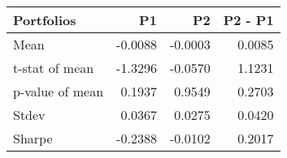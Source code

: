 \begin{tabular}{lrrr}
\toprule
Portfolios & P1 & P2 & P2 - P1 \\
\midrule
Mean & -0.0088 & -0.0003 & 0.0085 \\
t-stat of mean & -1.3296 & -0.0570 & 1.1231 \\
p-value of mean & 0.1937 & 0.9549 & 0.2703 \\
Stdev & 0.0367 & 0.0275 & 0.0420 \\
Sharpe & -0.2388 & -0.0102 & 0.2017 \\
\bottomrule
\end{tabular}
